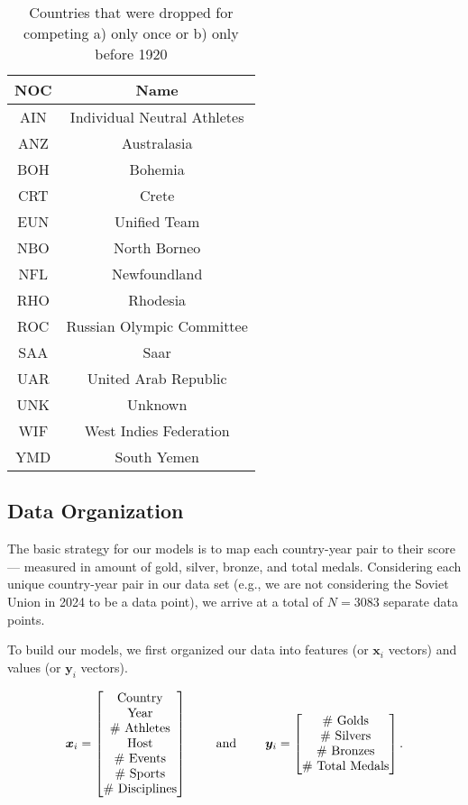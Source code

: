 \documentclass[12pt]{article}
\begin{document}
\begin{table}[h]
\centering
	\begin{tabular}{|c|c|}
		\hline
		NOC & Name\\
		\hline
		\hline
		AIN & Individual Neutral Athletes\\\hline
		ANZ & Australasia\\\hline
		BOH & Bohemia \\\hline
		CRT & Crete\\\hline
		EUN & Unified Team\\\hline
		NBO & North Borneo\\\hline
		NFL & Newfoundland\\\hline
		RHO & Rhodesia\\\hline
		ROC & Russian Olympic Committee\\\hline
		SAA & Saar\\\hline
		UAR & United Arab Republic \\\hline
		UNK & Unknown\\\hline
		WIF & West Indies Federation\\\hline
		YMD & South Yemen\\\hline
	\end{tabular}
	\caption{Countries that were dropped for competing a) only once or b) only before 1920}

\end{table}



\subsection{Data Organization}
The basic strategy for our models is to map each country-year pair to their score — measured in amount of gold, silver, bronze, and total medals.
Considering each unique country-year pair in our data set (e.g., we are not considering the Soviet Union in 2024 to be a data point), we arrive at a total of $N=3083$ separate data points.



To build our models, we first organized our data into features (or $\bm{x}_i$ vectors) and values (or $\bm{y}_i$ vectors).


\begin{equation*}
	\bm{x}_i = \begin{bmatrix}
	\text{Country}\\
	\text{Year}\\
	\text{\# Athletes}\\
	\text{Host}\\
	\text{\# Events}\\
	\text{\# Sports}\\
	\text{\# Disciplines}
	\end{bmatrix}
	\hspace{8mm}
	\text{and}
	\hspace{8mm}
	\bm{y}_i = \begin{bmatrix}
		\text{\# Golds}\\
		\text{\# Silvers}\\
		\text{\# Bronzes}\\
		\text{\# Total Medals}
	\end{bmatrix}.
\end{equation*}
\end{document}
